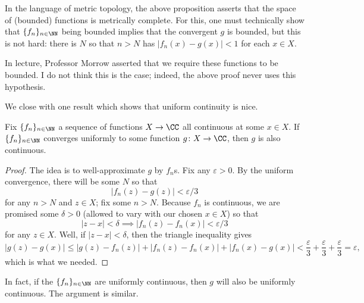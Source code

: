 \begin{remark}[Nir]
	In the language of metric topology, the above proposition asserts that the space of (bounded) functions is metrically complete. For this, one must technically show that $\{f_n\}_{n\in\NN}$ being bounded implies that the convergent $g$ is bounded, but this is not hard: there is $N$ so that $n>N$ has $|f_n(x)-g(x)|<1$ for each $x\in X$.
\end{remark}
\begin{remark}
	In lecture, Professor Morrow asserted that we require these functions to be bounded. I do not think this is the case; indeed, the above proof never uses this hypothesis.
\end{remark}
We close with one result which shows that uniform continuity is nice.
\begin{proposition} \label{prop:uniformgoodcontinuity}
	Fix $\{f_n\}_{n\in\NN}$ a sequence of functions $X\to\CC$ all continuous at some $x\in X$. If $\{f_n\}_{n\in\NN}$ converges uniformly to some function $g\colon X\to\CC$, then $g$ is also continuous.
\end{proposition}
\begin{proof}
	The idea is to well-approximate $g$ by $f_n$s. Fix any $\varepsilon>0$. By the uniform convergence, there will be some $N$ so that
	\[|f_n(z)-g(z)|<\varepsilon/3\]
	for any $n>N$ and $z\in X$; fix some $n>N$. Because $f_n$ is continuous, we are promised some $\delta>0$ (allowed to vary with our chosen $x\in X$) so that
	\[|z-x|<\delta\implies|f_n(z)-f_n(x)|<\varepsilon/3\]
	for any $z\in X$. Well, if $|z-x|<\delta$, then the triangle inequality gives
	\[|g(z)-g(x)|\le|g(z)-f_n(z)|+|f_n(z)-f_n(x)|+|f_n(x)-g(x)|<\frac\varepsilon3+\frac\varepsilon3+\frac\varepsilon3=\varepsilon,\]
	which is what we needed.
\end{proof}
\begin{remark}[Nir]
	In fact, if the $\{f_n\}_{n\in\NN}$ are uniformly continuous, then $g$ will also be uniformly continuous. The argument is similar.
\end{remark}